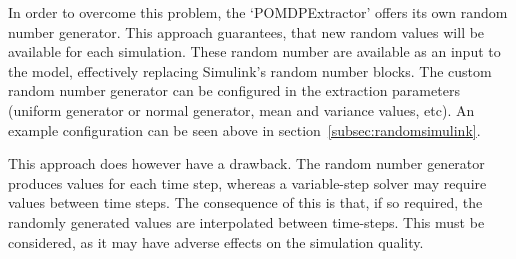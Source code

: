 In order to overcome this problem, the `POMDPExtractor' offers its own random number generator. This approach guarantees, that new random values will be available for each simulation. These random number are available as an input to the model, effectively replacing Simulink's random number blocks. The custom random number generator can be configured in the extraction parameters (uniform generator or normal generator, mean and variance values, etc). An example configuration can be seen above in section~\ref{subsec:randomsimulink}.

This approach does however have a drawback. The random number generator produces values for each time step, whereas a variable-step solver may require values between time steps. The consequence of this is that, if so required, the randomly generated values are interpolated between time-steps. This must be considered, as it may have adverse effects on the simulation quality.


